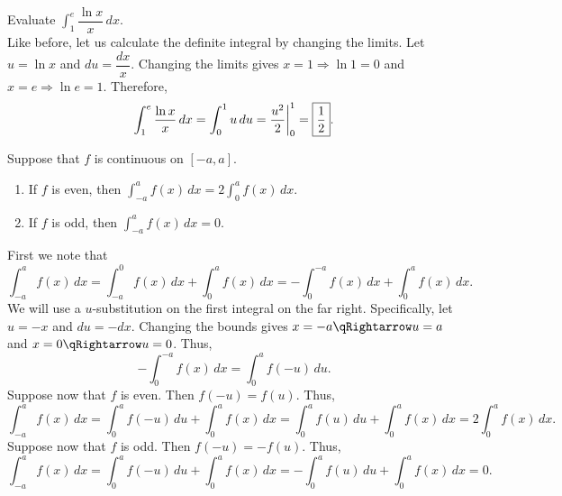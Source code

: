 \documentclass{book}
\newcommand{\dx}{\,dx}
\newcommand{\du}{\,du}
\newcommand{\dint}{\displaystyle \int}
\begin{document}
\begin{Exam} Evaluate  $\dint_1^e \dfrac{\ln x}{x}\dx$.\\

Like before, let us calculate the definite integral by changing the limits. Let $u = \ln x$ and $du = \dfrac{dx}{x}$. Changing the limits gives $x = 1 \Rightarrow \ln 1 = 0$ and $x=e \Rightarrow \ln e = 1$. Therefore, \[\int_1^e \dfrac{\ln x}{x}\dx = \int_0^1 u\du = \dfrac{u^2}{2}\bigg\vert_0^1 = \fbox{$\dfrac{1}{2}$}. \]
\end{Exam}\vs

\begin{Thm} Suppose that $f$ is continuous on $[-a,a]$. 
\begin{enumerate}[!THM!,start=1]
\item If $f$ is even, then $\dint_{-a}^a f(x)\dx = 2\int_0^a f(x)\dx$.\\
\item If $f$ is odd, then $\dint_{-a}^a f(x)\dx = 0$.\\
\end{enumerate}
\end{Thm}
\begin{pf}
First we note that 
\[\dint_{-a}^a f(x)\dx = \dint_{-a}^0 f(x)\dx + \dint_0^a f(x)\dx = -\dint_0^{-a} f(x)\dx + \dint_0^a f(x)\dx.\]
We will use a $u$-substitution on the first integral on the far right. Specifically, let $u = -x$ and $du = -dx$. Changing the bounds gives $x = -a \qRightarrow u = a$ and $x = 0 \qRightarrow u = 0$. Thus,
\[-\dint_0^{-a} f(x)\dx = \dint_0^{a} f(-u)\du.\]
Suppose now that $f$ is even. Then $f(-u) = f(u)$. Thus,
\[\dint_{-a}^a f(x)\dx =  \dint_0^{a} f(-u)\du + \dint_0^a f(x)\dx =  \dint_0^{a} f(u)\du + \dint_0^a f(x)\dx =  2\dint_0^a f(x)\dx.\]
Suppose now that $f$ is odd. Then $f(-u) = -f(u)$. Thus,
\[\dint_{-a}^a f(x)\dx =  \dint_0^{a} f(-u)\du + \dint_0^a f(x)\dx =  -\dint_0^{a} f(u)\du + \dint_0^a f(x)\dx =  0. \]
\end{pf}\vs
\end{document}

